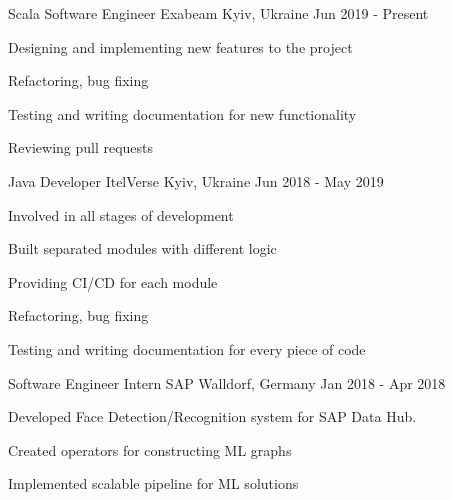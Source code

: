 \begin{cventries}

   \cventry
    {Scala Software Engineer} %
    {Exabeam} %
    {Kyiv, Ukraine} %
    {Jun 2019 - Present} %
    {
      \begin{cvitems} %
        \item { Designing and implementing new features to the project }
        \item { Refactoring, bug fixing }
        \item { Testing and writing documentation for new functionality }
        \item { Reviewing pull requests }
      \end{cvitems}
    }

  \cventry
    {Java Developer} %
    {ItelVerse} %
    {Kyiv, Ukraine} %
    {Jun 2018 - May 2019} %
    {
      \begin{cvitems} %
        \item { Involved in all stages of development }
        \item { Built separated modules with different logic }
        \item { Providing CI/CD for each module}
        \item { Refactoring, bug fixing }
        \item { Testing and writing documentation for every piece of code}
      \end{cvitems}
    }

  \cventry
    {Software Engineer Intern} %
    {SAP} %
    {Walldorf, Germany} %
    {Jan 2018 - Apr 2018} %
    {
      \begin{cvitems} %
        \item { Developed Face Detection/Recognition system for SAP Data Hub. }
        \item { Created operators for constructing ML graphs }
        \item { Implemented scalable pipeline for ML solutions }
      \end{cvitems}
    }


\end{cventries}
